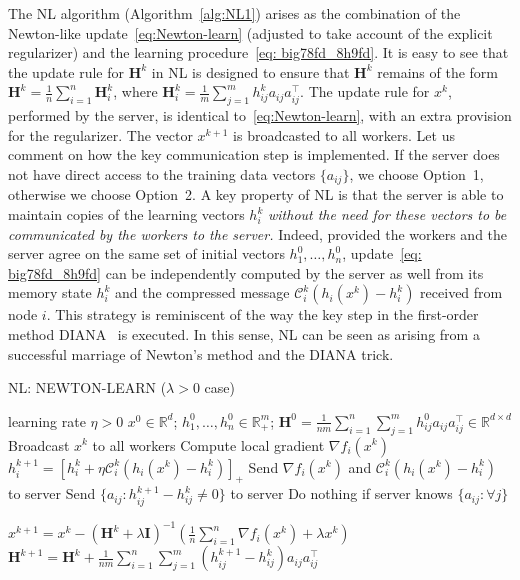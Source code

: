 \documentclass[12pt]{article}
\newcommand{\R}{\mathbb{R}}
\newcommand{\newalpha}{h}
\newcommand{\mH}{\mathbf{H}}
\newcommand{\mI}{\mathbf{I}}
\newcommand{\cC}{{\mathcal{C}}}
\begin{document}
The {\sf NL} algorithm (Algorithm~\ref{alg:NL1}) arises as the combination of the Newton-like update~\eqref{eq:Newton-learn} (adjusted to take account of the explicit regularizer) and the learning procedure~\eqref{eq: big78fd_8h9fd}. It is easy to see that the update rule for $\mH^k$ in {\sf NL} is designed to ensure that $\mH^k$ remains of the form  $\mH^k = \frac{1}{n}\sum_{i=1}^n \mH^k_i$, where $\mH^k_i = \frac{1}{m} \sum_{j=1}^{m} h^k_{ij} a_{ij}a_{ij}^\top$. The update rule for $x^k$, performed by the server, is identical to~\eqref{eq:Newton-learn},  with an extra provision for the regularizer. The vector $x^{k+1}$ is broadcasted to all workers. Let us comment on how the key communication step is implemented. If the server does not have direct access to the training data vectors $\{a_{ij} \}$, we choose Option~1, otherwise we choose Option~2. A key property of {\sf NL} is that the server is able to maintain  copies of the learning vectors $h_i^k$ {\em without the need for these vectors to be communicated by the workers to the server.} Indeed, provided the workers and the server agree on the same set of initial vectors $h_1^0, \dots, h_n^0$, update~\eqref{eq: big78fd_8h9fd} can be independently computed by  the server as well from its memory state $h_i^k$ and the compressed message $\cC_i^k (\newalpha_i(x^k) - h^k_i)$ received from node $i$. This strategy is reminiscent of the way the key step in the first-order method DIANA~\citep{DIANA, DIANA2} is executed. In this sense, {\sf NL} can be seen as arising from a successful marriage of Newton's method and the DIANA trick.





\begin{algorithm}[tb]
	\caption{{\sf NL: NEWTON-LEARN} ($\lambda>0$ case)}
	\label{alg:NL1}
\begin{algorithmic}
		 learning rate $\eta>0$ 
		$x^0 \in \R^d$; $h^0_1,\dots, h^0_n \in \R^{m}_{+}$; $\mH^0 =  \frac{1}{nm} \sum \limits_{i=1}^n  \sum\limits_{j=1}^{m} h_{ij}^0 a_{ij}a_{ij}^\top\in \R^{d\times d}$
		\STATE Broadcast $x^k$ to all workers
		\STATE Compute local gradient $\nabla f_i(x^k)$ 
		\STATE $h^{k+1}_i = [h^k_i + \eta \cC_i^k (\newalpha_i(x^k) - h^k_i)]_+$ 
		\STATE Send $\nabla f_i(x^k)$ and $\cC_i^k (\newalpha_i(x^k) - h^k_i)$ to server 
		 Send $\{a_{ij} : h_{ij}^{k+1} - h_{ij}^k \neq 0\}$ to server
		 Do nothing if server knows $\{a_{ij} : \forall j\}$
		\ENDFOR
		
		\STATE $x^{k+1} = x^k - \left( \mH^k + \lambda \mI \right)^{-1} \left(  \frac{1}{n} \sum\limits_{i=1}^n \nabla f_i(x^k) + \lambda x^k  \right)$
		\STATE $\mH^{k+1} = \mH^k + \frac{1}{nm} \sum \limits_{i=1}^n  \sum\limits_{j=1}^{m} (h_{ij}^{k+1} - h_{ij}^k) a_{ij}a_{ij}^\top $
		\ENDFOR
\end{algorithmic}
\end{algorithm} 
\end{document}
